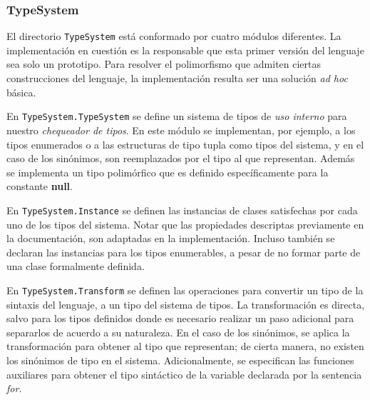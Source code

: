 \subsubsection{TypeSystem}

El directorio \lstinline[style = module]{TypeSystem} está conformado por cuatro módulos diferentes.
La implementación en cuestión es la responsable que esta primer versión del lenguaje sea solo un prototipo.
Para resolver el polimorfismo que admiten ciertas construcciones del lenguaje, la implementación resulta ser una solución \textit{ad hoc} básica.

En \lstinline[style = module]{TypeSystem.TypeSystem} se define un sistema de tipos de \textit{uso interno} para nuestro \textit{chequeador de tipos}.
En este módulo se implementan, por ejemplo, a los tipos enumerados o a las estructuras de tipo tupla como tipos del sistema, y en el caso de los sinónimos, son reemplazados por el tipo al que representan.
Además se implementa un tipo polimórfico que es definido específicamente para la constante \textbf{null}.

En \lstinline[style = module]{TypeSystem.Instance} se definen las instancias de clases satisfechas por cada uno de los tipos del sistema.
Notar que las propiedades descriptas previamente en la documentación, son adaptadas en la implementación.
Incluso también se declaran las instancias para los tipos enumerables, a pesar de no formar parte de una clase formalmente definida.

En \lstinline[style = module]{TypeSystem.Transform} se definen las operaciones para convertir un tipo de la sintaxis del lenguaje, a un tipo del sistema de tipos.
La transformación es directa, salvo para los tipos definidos donde es necesario realizar un paso adicional para separarlos de acuerdo a su naturaleza.
En el caso de los sinónimos, se aplica la transformación para obtener al tipo que representan; de cierta manera, no existen los sinónimos de tipo en el sistema.
Adicionalmente, se especifican las funciones auxiliares para obtener el tipo sintáctico de la variable declarada por la sentencia \textit{for}.

